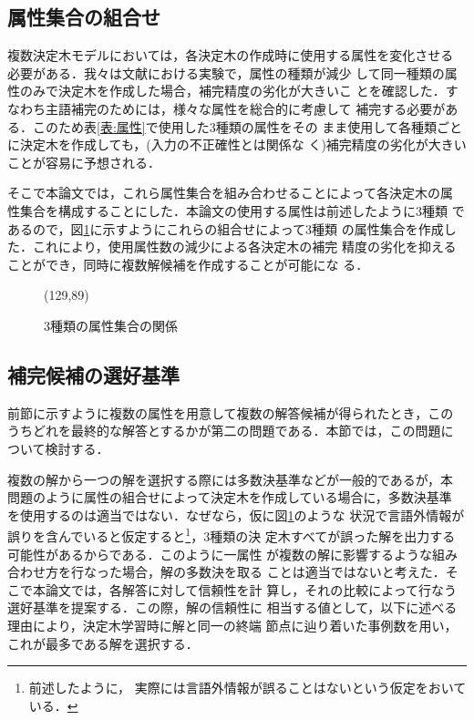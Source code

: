 \subsection{属性集合の組合せ}
\label{節:組合せ}

複数決定木モデルにおいては，各決定木の作成時に使用する属性を変化させる
必要がある．我々は文献\cite{主語補完}における実験で，属性の種類が減少
して同一種類の属性のみで決定木を作成した場合，補完精度の劣化が大きいこ
とを確認した．すなわち主語補完のためには，様々な属性を総合的に考慮して
補完する必要がある．このため表\ref{表:属性}で使用した3種類の属性をその
まま使用して各種類ごとに決定木を作成しても，(入力の不正確性とは関係な
く)補完精度の劣化が大きいことが容易に予想される．

そこで本論文では，これら属性集合を組み合わせることによって各決定木の属
性集合を構成することにした．本論文の使用する属性は前述したように3種類
であるので，図\ref{図:属性集合}に示すようにこれらの組合せによって3種類
の属性集合を作成した．これにより，使用属性数の減少による各決定木の補完
精度の劣化を抑えることができ，同時に複数解候補を作成することが可能にな
る．

\begin{figure}
\begin{center}
    \begin{epsf}
    \end{epsf}
    \begin{draft}
    \atari(129,89)
    \end{draft}
\vspace{-10mm}
\caption{3種類の属性集合の関係}
\label{図:属性集合}
\end{center}
\end{figure}


\subsection{補完候補の選好基準}
\label{節:選好}

前節に示すように複数の属性を用意して複数の解答候補が得られたとき，この
うちどれを最終的な解答とするかが第二の問題である．本節では，この問題に
ついて検討する．

複数の解から一つの解を選択する際には多数決基準などが一般的であるが，本
問題のように属性の組合せによって決定木を作成している場合に，多数決基準
を使用するのは適当ではない．なぜなら，仮に図\ref{図:属性集合}のような
状況で言語外情報が誤りを含んでいると仮定すると\footnote{前述したように，
実際には言語外情報が誤ることはないという仮定をおいている．}，3種類の決
定木すべてが誤った解を出力する可能性があるからである．このように一属性
が複数の解に影響するような組み合わせ方を行なった場合，解の多数決を取る
ことは適当ではないと考えた．そこで本論文では，各解答に対して信頼性を計
算し，それの比較によって行なう選好基準を提案する．この際，解の信頼性に
相当する値として，以下に述べる理由により，決定木学習時に解と同一の終端
節点に辿り着いた事例数を用い，これが最多である解を選択する．

